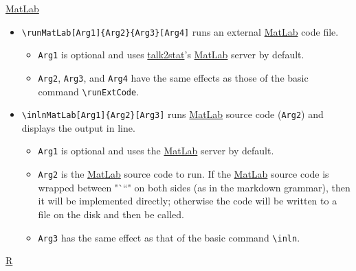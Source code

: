 \documentclass{ltxdoc}
\begin{document}
\href{https://www.mathworks.com/products/matlab.html}{MatLab}

\begin{itemize}
\item \texttt{\textbackslash{}runMatLab[Arg1]\{Arg2\}\{Arg3\}[Arg4]} runs an external
\href{https://www.mathworks.com/products/matlab.html}{MatLab} code file.
\begin{itemize}
\item \texttt{Arg1} is optional and uses
\href{https://pypi.org/project/talk2stat/}{talk2stat}'s
\href{https://www.mathworks.com/products/matlab.html}{MatLab} server by
default.
\item \texttt{Arg2}, \texttt{Arg3}, and \texttt{Arg4} have the same effects as those of the
basic command \texttt{\textbackslash{}runExtCode}.
\end{itemize}
\item \texttt{\textbackslash{}inlnMatLab[Arg1]\{Arg2\}[Arg3]} runs
\href{https://www.mathworks.com/products/matlab.html}{MatLab} source code
(\texttt{Arg2}) and displays the output in line.
\begin{itemize}
\item \texttt{Arg1} is optional and uses the
\href{https://www.mathworks.com/products/matlab.html}{MatLab} server by
default.
\item \texttt{Arg2} is the
\href{https://www.mathworks.com/products/matlab.html}{MatLab} source
code to run. If the
\href{https://www.mathworks.com/products/matlab.html}{MatLab} source
code is wrapped between "```" on both sides (as in the markdown
grammar), then it will be implemented directly; otherwise the code
will be written to a file on the disk and then be called.
\item \texttt{Arg3} has the same effect as that of the basic command \texttt{\textbackslash{}inln}.
\end{itemize}
\end{itemize}

\href{https://www.r-project.org/}{R}
\end{document}
